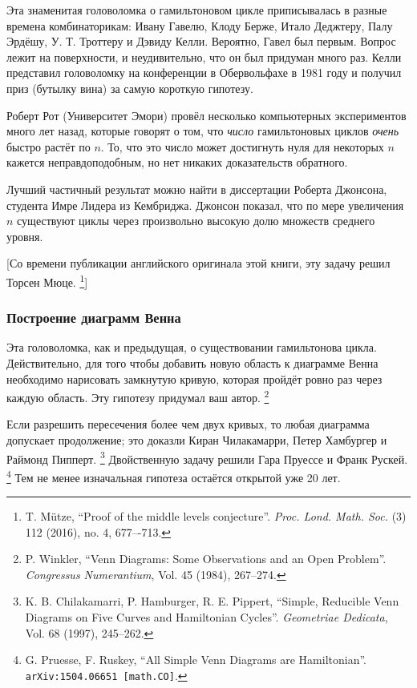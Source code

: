 Эта знаменитая головоломка о гамильтоновом цикле приписывалась в разные времена комбинаторикам: Ивану Гавелю, Клоду Берже, Итало Деджтеру, Палу Эрдёшу, У. Т. Троттеру и Дэвиду Келли.
Вероятно, Гавел был первым.
Вопрос лежит на поверхности, и неудивительно, что он был придуман много раз.
Келли представил головоломку на конференции в Обервольфахе в 1981 году и получил приз (бутылку вина) за самую короткую гипотезу.

Роберт Рот (Университет Эмори) провёл несколько компьютерных экспериментов много лет назад, которые говорят о том, что \emph{число} гамильтоновых циклов \emph{очень} быстро растёт по $n$.
То, что это число может достигнуть нуля для некоторых $n$ кажется неправдоподобным, но нет никаких доказательств обратного.

Лучший частичный результат можно найти в диссертации Роберта Джонсона, студента Имре Лидера из Кембриджа.
Джонсон показал, что по мере увеличения $n$ существуют циклы через произвольно высокую долю множеств среднего уровня.

[Со времени публикации английского оригинала этой книги, эту задачу решил Торсен Мюце.%
\footnote{T. Mütze, 
``Proof of the middle levels conjecture''.
\emph{Proc. Lond. Math. Soc.} (3) 112 (2016), no. 4, 677–-713.}]

\subsubsection*{Построение диаграмм Венна}

Эта головоломка, как и предыдущая, о существовании гамильтонова цикла. 
Действительно, для того чтобы добавить новую область к диаграмме Венна необходимо нарисовать замкнутую кривую, которая пройдёт ровно раз через каждую область.
Эту гипотезу придумал ваш автор.%
\footnote{P. Winkler, ``Venn Diagrams: Some Observations and an Open Problem''. \emph{Congressus Numerantium}, Vol. 45 (1984), 267--274.}

Если разрешить пересечения более чем двух кривых, то любая диаграмма допускает продолжение; это доказли Киран Чилакамарри, Петер Хамбургер и Раймонд Пипперт.%
\footnote{K. B. Chilakamarri, P. Hamburger, R. E. Pippert,
``Simple, Reducible Venn Diagrams on Five Curves and Hamiltonian Cycles''. \emph{Geometriae Dedicata}, Vol. 68 (1997), 245--262.}
Двойственную задачу решили Гара Пруессе и Франк Рускей.%
\footnote{
G. Pruesse, F. Ruskey,
``All Simple Venn Diagrams are Hamiltonian''.
\texttt{arXiv:1504.06651 [math.CO]}.
}
Тем не менее изначальная гипотеза остаётся открытой уже 20 лет.

